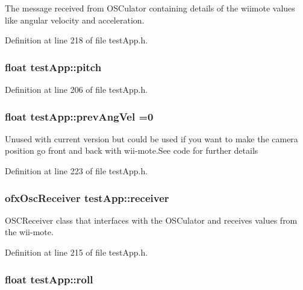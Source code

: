 The message received from O\-S\-Culator containing details of the wiimote values like angular velocity and acceleration. 



Definition at line 218 of file test\-App.\-h.

\hypertarget{group___wii_mote_gaabbebeb113838374f659e86a0355b260}{
\subsubsection[{pitch}]{\setlength{\rightskip}{0pt plus 5cm}float test\-App\-::pitch}}\label{group___wii_mote_gaabbebeb113838374f659e86a0355b260}


Definition at line 206 of file test\-App.\-h.

\hypertarget{group___wii_mote_ga8a2b9b9cf76097e20f148b616297029b}{
\subsubsection[{prev\-Ang\-Vel}]{\setlength{\rightskip}{0pt plus 5cm}float test\-App\-::prev\-Ang\-Vel =0}}\label{group___wii_mote_ga8a2b9b9cf76097e20f148b616297029b}
Unused with current version but could be used if you want to make the camera position go front and back with wii-\/mote.\-See code for further details 

Definition at line 223 of file test\-App.\-h.

\hypertarget{group___wii_mote_ga034c44ff60fa1e5f021e90d5410ba657}{
\subsubsection[{receiver}]{\setlength{\rightskip}{0pt plus 5cm}ofx\-Osc\-Receiver test\-App\-::receiver}}\label{group___wii_mote_ga034c44ff60fa1e5f021e90d5410ba657}


O\-S\-C\-Receiver class that interfaces with the O\-S\-Culator and receives values from the wii-\/mote. 



Definition at line 215 of file test\-App.\-h.

\hypertarget{group___wii_mote_ga020730abb55e6ae6d0a28edee19050e0}{
\subsubsection[{roll}]{\setlength{\rightskip}{0pt plus 5cm}float test\-App\-::roll}}\label{group___wii_mote_ga020730abb55e6ae6d0a28edee19050e0}


